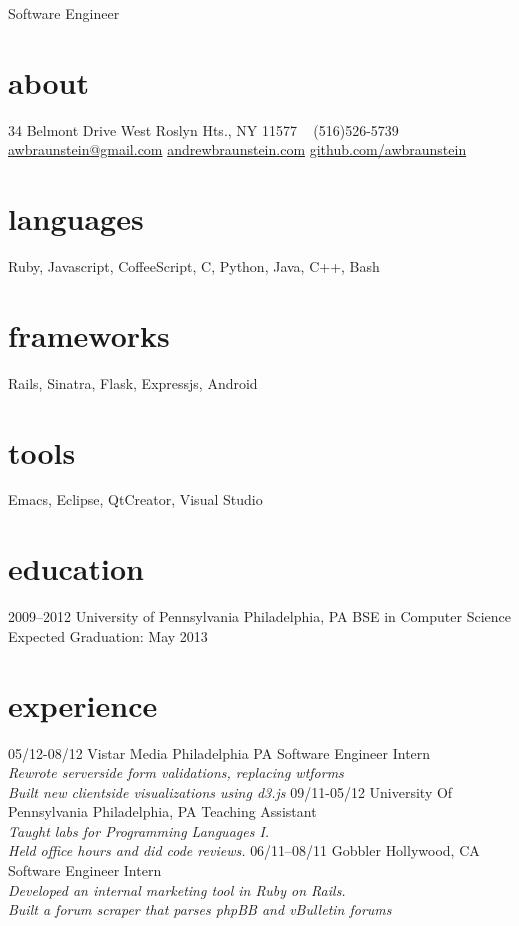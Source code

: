 \documentclass[print]{friggeri-cv}
\begin{document}
       {Software Engineer}


\begin{aside}
  \section{about}
  34 Belmont Drive West
  Roslyn Hts., NY 11577
  ~
  (516)526-5739
  ~
  \href{mailto:awbraunstein@gmail.com}{awbraunstein@gmail.com}
  \href{http://andrewbraunstein.com}{andrewbraunstein.com}
  \href{http://github.com/awbraunstein}{github.com/awbraunstein}
  \section{languages}
  Ruby, Javascript, CoffeeScript, C, Python, Java, C++, Bash
  \section{frameworks}
  Rails, Sinatra, Flask, Expressjs, Android
  \section{tools}
  Emacs, Eclipse, QtCreator, Visual Studio
\end{aside}

\section{education}

\begin{entrylist}
  \entry
    {2009–2012}
    {University of Pennsylvania}
    {Philadelphia, PA}
    {BSE in Computer Science \\
    Expected Graduation: May 2013}
\end{entrylist}

\section{experience}

\begin{entrylist}
  \entry
    {05/12-08/12}
    {Vistar Media}
    {Philadelphia PA}
    {Software Engineer Intern \\
      \emph{Rewrote serverside form validations, replacing wtforms \\ 
        Built new clientside visualizations using d3.js }}
  \entry
    {09/11-05/12}
    {University Of Pennsylvania}
    {Philadelphia, PA}
    {Teaching Assistant \\
      \emph{Taught labs for Programming Languages I. \\ 
        Held office hours and did code reviews.}}
  \entry
    {06/11–08/11}
    {Gobbler}
    {Hollywood, CA}
    {Software Engineer Intern \\ 
      \emph{Developed an internal marketing tool in Ruby on Rails. \\ 
      Built a forum scraper that parses phpBB and vBulletin forums}}

\end{entrylist}
\end{document}
